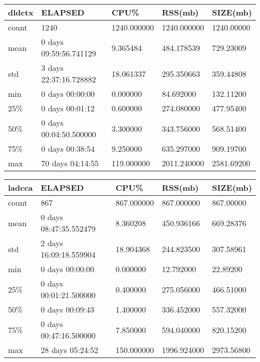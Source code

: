 \documentclass{article}
\begin{document}
\begin{table}[H]
\begin{tabular}{|l|l|l|l|l|}
\hline dldctx& ELAPSED&    CPU\%&  RSS(mb)&   SIZE(mb) \\
\hline count&   1240& 1240.000000& 1240.000000& 1240.00000 \\
\hline mean&  0 days 09:59:56.741129&   9.365484&  484.178539&  729.23009 \\
\hline std&  3 days 22:37:16.728882&  18.061337&  295.350663&  359.44808 \\
\hline min&   0 days 00:00:00&   0.000000&  84.692000&  132.11200 \\
\hline 25\%&   0 days 00:01:12&   0.600000&  274.080000&  477.95400 \\
\hline 50\%&  0 days 00:04:50.500000&   3.300000&  343.756000&  568.51400 \\
\hline 75\%&   0 days 00:38:54&   9.250000&  635.297000&  909.19700 \\
\hline max&  70 days 04:14:55&  119.000000& 2011.240000& 2581.69200 \\
\hline 
\end{tabular}
\label{TABLE-SessionSizedldctx}
\end{table}

\begin{table}[H]
\begin{tabular}{|l|l|l|l|l|}
\hline ladcca& ELAPSED&   CPU\%&  RSS(mb)&   SIZE(mb) \\
\hline count&    867& 867.000000&  867.000000&  867.00000 \\
\hline mean&  0 days 08:47:35.552479&  8.360208&  450.936166&  669.28376 \\
\hline std&  2 days 16:09:18.559904&  18.904368&  244.823500&  307.58961 \\
\hline min&   0 days 00:00:00&  0.000000&  12.792000&  22.89200 \\
\hline 25\%&  0 days 00:01:21.500000&  0.400000&  275.056000&  466.51000 \\
\hline 50\%&   0 days 00:09:43&  1.400000&  336.452000&  557.32000 \\
\hline 75\%&  0 days 00:47:16.500000&  7.850000&  594.040000&  820.15200 \\
\hline max&  28 days 05:24:52& 150.000000& 1996.924000& 2973.56800 \\
\hline 
\end{tabular}
\label{TABLE-SessionSizeladcca}
\end{table}
\end{document}
